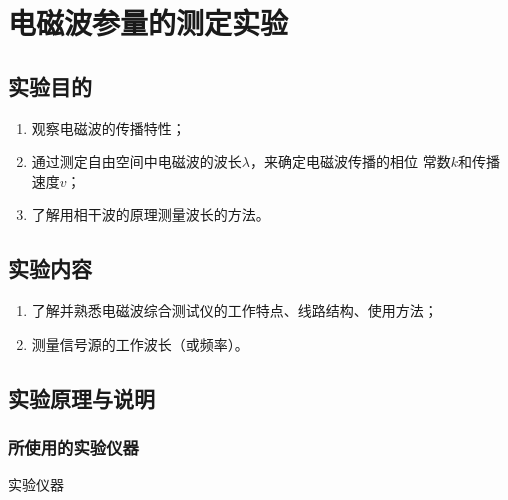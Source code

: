 \documentclass[../main]{subfiles}
\begin{document}
\chapter{电磁波参量的测定实验}%
\label{cha:电磁波参量的测定实验}

\section{实验目的}%
\label{sec:\arabic{chapter}实验目的}

\begin{enumerate}

	\item 观察电磁波的传播特性；

	\item 通过测定自由空间中电磁波的波长$ \lambda $，来确定电磁波传播的相位
		常数$ k $和传播速度$ v $；

	\item 了解用相干波的原理测量波长的方法。

\end{enumerate}

\section{实验内容}%
\label{sec:\arabic{chapter}实验内容}

\begin{enumerate}

	\item 了解并熟悉电磁波综合测试仪的工作特点、线路结构、使用方法；

	\item 测量信号源的工作波长（或频率）。

\end{enumerate}

\section{实验原理与说明}%
\label{sec:\arabic{chapter}实验原理与说明}

\subsection{所使用的实验仪器}%
\label{sub:\arabic{chapter}所使用的实验仪器}

\begin{table}[htbp]
	\centering
	\caption{实验仪器}
	\label{tab:\arabic{chapter}实验仪器}
\end{table}
\end{document}
